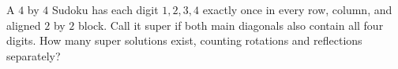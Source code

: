 A $4$ by $4$ Sudoku has each digit $1,2,3,4$ exactly once in every row, column, and aligned $2$ by $2$ block. Call it super if both main diagonals also contain all four digits. How many super solutions exist, counting rotations and reflections separately?
